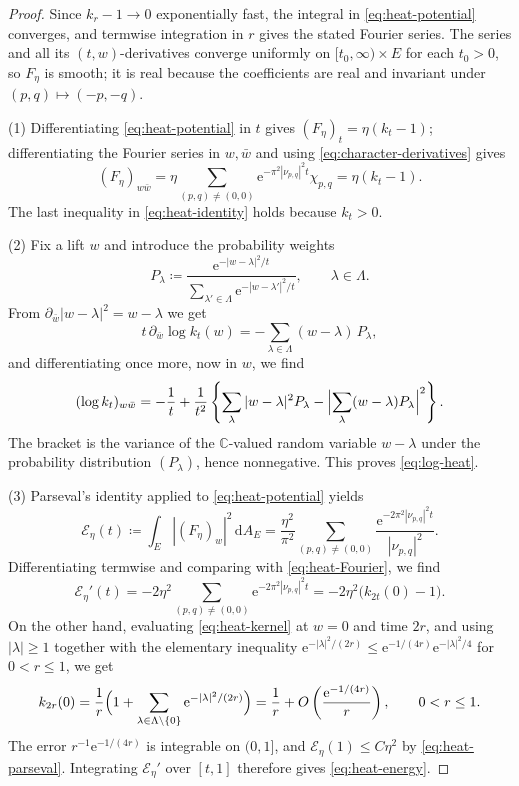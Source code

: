 \documentclass[11pt,a4paper]{article}
\begin{document}
	\begin{proof}
		Since
		$k_r-1\to0$ exponentially fast, the integral in
		\eqref{eq:heat-potential} converges, and termwise integration in $r$
		gives the stated Fourier series.  The series and all its
		$(t,w)$-derivatives converge uniformly on $[t_0,\infty)\times E$ for
		each $t_0>0$, so $F_\eta$ is smooth; it is real because the
		coefficients are real and invariant under
		$(p,q)\mapsto(-p,-q)$.
		
		(1)  Differentiating \eqref{eq:heat-potential} in $t$ gives
		$(F_\eta)_t=\eta(k_t-1)$; differentiating the Fourier series in
		$w,\bar w$ and using \eqref{eq:character-derivatives} gives
		\[
		(F_\eta)_{w\bar w}
		=\eta\sum_{(p,q)\ne(0,0)}\mathrm{e}^{-\pi^2|\nu_{p,q}|^2t}\chi_{p,q}
		=\eta(k_t-1). 
		\]
		The last inequality in \eqref{eq:heat-identity} holds
		because $k_t>0$.
		
		(2)  Fix a lift $w$ and introduce the probability weights
		\[
		P_{\lambda}\coloneqq \frac{\mathrm{e}^{-|w-\lambda|^2/t}}
		{\sum_{\lambda'\in\Lambda}\mathrm{e}^{-|w-\lambda'|^2/t}},
		\qquad\lambda\in\Lambda .
		\]
		From $\partial_{\bar w}|w-\lambda|^2=w-\lambda$ we get
		\begin{equation}
			t\,\partial_{\bar w}\log k_t(w)
			=-\sum_{\lambda\in\Lambda}(w-\lambda)\,P_\lambda ,
			\label{eq:heat-log-gradient-exact}
		\end{equation}
		and differentiating once more, now in $w$, we find
		\[
		(\log k_t)_{w\bar w}
		=-\frac1t+\frac1{t^2}
		\left\{
		\sum_{\lambda}|w-\lambda|^2P_{\lambda}
		-\Bigl|\sum_{\lambda}(w-\lambda)P_{\lambda}\Bigr|^2
		\right\}.
		\]
		The bracket is the variance of the $\mathbb C$-valued random variable
		$w-\lambda$ under the probability distribution $(P_\lambda)$, hence
		nonnegative.  This proves \eqref{eq:log-heat}.
		
		(3) Parseval's identity applied to \eqref{eq:heat-potential} yields
		\begin{equation}
			\mathcal E_\eta(t)\coloneqq \int_E|(F_\eta)_w|^2\,\mathrm{d}A_E
			=\frac{\eta^2}{\pi^2}
			\sum_{(p,q)\ne(0,0)}
			\frac{\mathrm{e}^{-2\pi^2|\nu_{p,q}|^2t}}
			{|\nu_{p,q}|^2}.
			\label{eq:heat-parseval}
		\end{equation}
		Differentiating termwise and comparing with \eqref{eq:heat-Fourier}, we find
		\[
		\mathcal E_\eta'(t)
		=-2\eta^2\sum_{(p,q)\ne(0,0)}\mathrm{e}^{-2\pi^2|\nu_{p,q}|^2t}
		=-2\eta^2\bigl(k_{2t}(0)-1\bigr).
		\]
		On the other hand, evaluating \eqref{eq:heat-kernel} at $w=0$ and time $2r$, and using $|\lambda|\ge1$ together with the elementary inequality 
		\(
		\mathrm{e}^{-|\lambda|^2/(2r)}\le
		\mathrm{e}^{-1/(4r)}\mathrm{e}^{-|\lambda|^2/4}
		\)
		for $0<r\le1$, we get
		\[
		k_{2r}(0)
		=\frac1r\Bigl(1+
		\sum_{\lambda\in\Lambda\setminus\{0\}}
		\mathrm{e}^{-|\lambda|^2/(2r)}\Bigr)
		=\frac1r+O\left(\frac{\mathrm{e}^{-1/(4r)}}{r}\right),
		\qquad 0<r\le1 .
		\]
		The error $r^{-1}\mathrm{e}^{-1/(4r)}$ is integrable on $(0,1]$, and
		$\mathcal E_\eta(1)\le C\eta^2$ by \eqref{eq:heat-parseval}.
		Integrating $\mathcal E_\eta'$ over $[t,1]$ therefore gives
		\eqref{eq:heat-energy}.
		

\end{proof}
\end{document}
